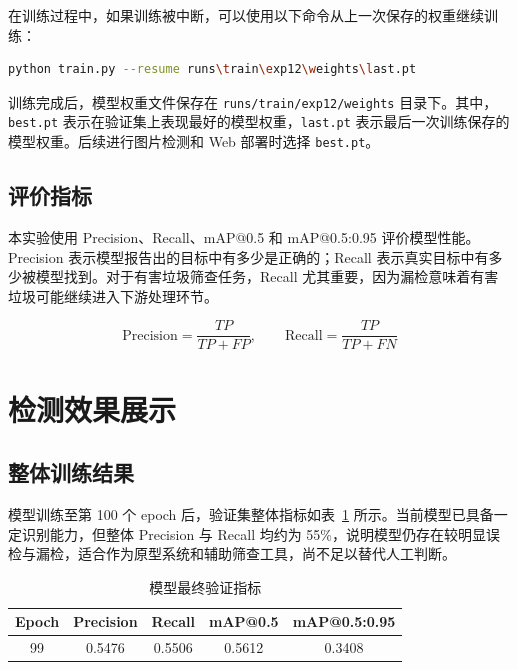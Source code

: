 \documentclass[UTF8,a4paper,12pt]{ctexart}
\begin{document}
在训练过程中，如果训练被中断，可以使用以下命令从上一次保存的权重继续训练：

\begin{lstlisting}[language=bash,caption={断点续训命令}]
python train.py --resume runs\train\exp12\weights\last.pt
\end{lstlisting}

训练完成后，模型权重文件保存在 \texttt{runs/train/exp12/weights} 目录下。其中，\texttt{best.pt} 表示在验证集上表现最好的模型权重，\texttt{last.pt} 表示最后一次训练保存的模型权重。后续进行图片检测和 Web 部署时选择 \texttt{best.pt}。

\subsection{评价指标}

本实验使用 Precision、Recall、mAP@0.5 和 mAP@0.5:0.95 评价模型性能。Precision 表示模型报告出的目标中有多少是正确的；Recall 表示真实目标中有多少被模型找到。对于有害垃圾筛查任务，Recall 尤其重要，因为漏检意味着有害垃圾可能继续进入下游处理环节。

\begin{equation}
  \mathrm{Precision}=\frac{TP}{TP+FP}, \qquad
  \mathrm{Recall}=\frac{TP}{TP+FN}
\end{equation}

\section{检测效果展示}

\subsection{整体训练结果}

模型训练至第 100 个 epoch 后，验证集整体指标如表~\ref{tab:metrics} 所示。当前模型已具备一定识别能力，但整体 Precision 与 Recall 均约为 55\%，说明模型仍存在较明显误检与漏检，适合作为原型系统和辅助筛查工具，尚不足以替代人工判断。

\begin{table}[H]
  \centering
  \caption{模型最终验证指标}
  \label{tab:metrics}
  \begin{tabular}{ccccc}
    \toprule
    Epoch & Precision & Recall & mAP@0.5 & mAP@0.5:0.95 \\
    \midrule
    99 & 0.5476 & 0.5506 & 0.5612 & 0.3408 \\
    \bottomrule
  \end{tabular}
\end{table}
\end{document}
